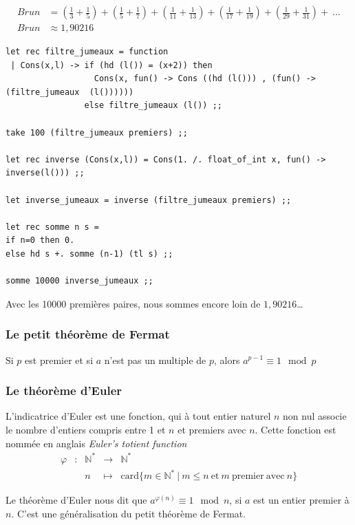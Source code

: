 \begin{align*}
   Brun &= (\frac{1}{3} + \frac{1}{5}) + (\frac{1}{5} + \frac{1}{7}) + (\frac{1}{11} + \frac{1}{13}) + (\frac{1}{17} + \frac{1}{19}) + (\frac{1}{29} + \frac{1}{31}) +\  ...  \\
   Brun &\approx 1,90216
\end{align*}


\begin{Verbatim}
let rec filtre_jumeaux = function
 | Cons(x,l) -> if (hd (l()) = (x+2)) then 
                  Cons(x, fun() -> Cons ((hd (l())) , (fun() ->  (filtre_jumeaux  (l())))))
                else filtre_jumeaux (l()) ;;

take 100 (filtre_jumeaux premiers) ;;

let rec inverse (Cons(x,l)) = Cons(1. /. float_of_int x, fun() -> inverse(l())) ;;

let inverse_jumeaux = inverse (filtre_jumeaux premiers) ;;

let rec somme n s =
if n=0 then 0.
else hd s +. somme (n-1) (tl s) ;;

somme 10000 inverse_jumeaux ;;
 \end{Verbatim}

 Avec les 10000 premières paires, nous sommes encore loin de $1,90216$\dots

\subsubsection{Le petit théorème de Fermat}
Si $p$ est premier et si $a$ n’est pas un multiple de $p$, alors $a^{p−1}≡1  \mod p$

\subsubsection{Le théorème d'Euler}
L'indicatrice d'Euler est une fonction, qui à tout entier naturel $n$ non nul associe
 le nombre d'entiers compris entre 1 et $n$ et premiers avec $n$. Cette fonction est nommée en anglais
 \textit{Euler's totient function}
$$
\begin{array}{ccccl}
  \varphi & : & \mathbb{N}^* & \longrightarrow & \mathbb{N}^* \\
   & & n& \longmapsto &\mathrm{card}\{ m \in \mathbb{N}^* ~|~m\le n~  \text{et}~m~\mathrm{premier~avec}~n \}
\end{array}
$$


Le théorème d'Euler nous dit que $ a^{\varphi (n)} \equiv 1 \mod n $, si $a$ est un entier premier à $n$.
C'est une généralisation du petit théorème de Fermat.


